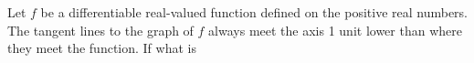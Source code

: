 Let $f$ be a differentiable real-valued function defined on the positive real numbers. The tangent lines to the graph of $f$ always meet the axis 1 unit lower than where they meet the function. If  what is 